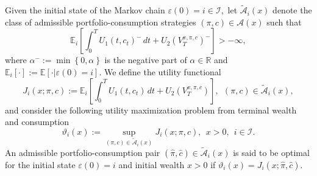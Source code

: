 \documentclass[11pt]{article}
\theoremstyle{plain}
\theoremstyle{definition}
\numberwithin{equation}{section}
\newcommand{\calA}{\mathcal{A}}
\newcommand{\set}[1]{\left\{#1\right\}}
\newcommand{\calI}{\mathcal{I}}
\newcommand{\eps}{\varepsilon}
\newcommand{\R}{\mathds{R}}
\newcommand{\Exp}{\mathds{E}}
\begin{document}
%
Given the initial state of the Markov chain $\eps(0)=i\in\calI,$ let $\tilde{\calA}_i(x)$ denote the class of admissible portfolio-consumption strategies $(\pi,c)\in\calA(x)$ such that
\[
\Exp_i\left[\int_0^T U_1(t,c_t)^{-}\,dt+U_2(V_T^{x,\pi,c})^{-}\right]>-\infty,
\]
where $\alpha^{-}:=\min\set{0,\alpha}$ is the negative part of $\alpha\in\R$ and $\Exp_i[\cdot]:=\Exp[\cdot|\eps(0)=i].$ We define the utility functional
\[
J_i(x;\pi,c):=\Exp_i\left[\int_0^T U_1(t,c_t)\,dt+U_2(V_T^{x,\pi,c})\right], \ \ (\pi,c)\in\tilde{\calA}_i(x),
\]
and consider the following utility maximization problem from terminal wealth and consumption
\begin{equation}\label{utilitymax}
\vartheta_i(x):=\sup_{(\pi,c)\in\tilde{\calA}_i(x)}J_i(x;\pi,c), \ \ x>0, \ \ i\in\calI.
\end{equation}
An admissible portfolio-consumption pair $(\hat{\pi},\hat{c})\in\tilde{\calA}_i(x)$ is said to be optimal for the initial state $\eps(0)=i$ and initial wealth $x>0$ if $\vartheta_i(x)=J_i(x;\hat{\pi},\hat{c}).$
\end{document}
